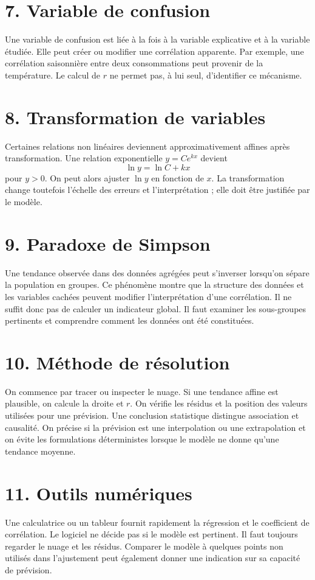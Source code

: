 \section{7. Variable de confusion}
Une variable de confusion est liée à la fois à la variable explicative et à la variable étudiée. Elle peut créer ou modifier une corrélation apparente.
Par exemple, une corrélation saisonnière entre deux consommations peut provenir de la température. Le calcul de $r$ ne permet pas, à lui seul, d'identifier ce mécanisme.
\section{8. Transformation de variables}
Certaines relations non linéaires deviennent approximativement affines après transformation. Une relation exponentielle $y=Ce^{kx}$ devient
\[
\ln y=\ln C+kx
\]
pour $y>0$. On peut alors ajuster $\ln y$ en fonction de $x$.
La transformation change toutefois l'échelle des erreurs et l'interprétation ; elle doit être justifiée par le modèle.
\section{9. Paradoxe de Simpson}
Une tendance observée dans des données agrégées peut s'inverser lorsqu'on sépare la population en groupes. Ce phénomène montre que la structure des données et les variables cachées peuvent modifier l'interprétation d'une corrélation.
Il ne suffit donc pas de calculer un indicateur global. Il faut examiner les sous-groupes pertinents et comprendre comment les données ont été constituées.
\section{10. Méthode de résolution}
On commence par tracer ou inspecter le nuage. Si une tendance affine est plausible, on calcule la droite et $r$. On vérifie les résidus et la position des valeurs utilisées pour une prévision.
Une conclusion statistique distingue association et causalité. On précise si la prévision est une interpolation ou une extrapolation et on évite les formulations déterministes lorsque le modèle ne donne qu'une tendance moyenne.
\section{11. Outils numériques}
Une calculatrice ou un tableur fournit rapidement la régression et le coefficient de corrélation. Le logiciel ne décide pas si le modèle est pertinent. Il faut toujours regarder le nuage et les résidus.
Comparer le modèle à quelques points non utilisés dans l'ajustement peut également donner une indication sur sa capacité de prévision.
